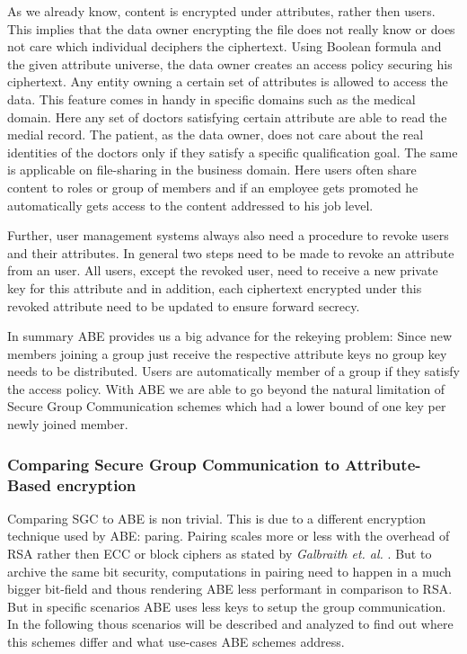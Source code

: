 As we already know, content is encrypted under attributes, rather then users. This implies that the data owner encrypting the file does not really know or does not care which individual deciphers the ciphertext. Using Boolean formula and the given attribute universe, the data owner creates an access policy securing his ciphertext. Any entity owning a certain set of attributes is allowed to access the data. This feature comes in handy in specific domains such as the medical domain. Here any set of doctors satisfying certain attribute are able to read the medial record. The patient, as the data owner, does not care about the real identities of the doctors only if they satisfy a specific qualification goal. The same is applicable on file-sharing in the business domain. Here users often share content to roles or group of members and if an employee gets promoted he automatically gets access to the content addressed to his job level. 

Further, user management systems always also need a procedure to revoke users and their attributes. 
In general two steps need to be made to revoke an attribute from an user. All users, except the revoked user, need to receive a new private key for this attribute and in addition, each ciphertext encrypted under this revoked attribute need to be updated to ensure forward secrecy. 

In summary ABE provides us a big advance for the rekeying problem: Since new members joining a group just receive the respective attribute keys no group key needs to be distributed. Users are automatically member of a group if they satisfy the access policy. With \ac{ABE} we are able to go beyond the natural limitation of Secure Group Communication schemes which had a lower bound of one key per newly joined member.  

\subsubsection{Comparing Secure Group Communication to Attribute-Based encryption}
Comparing \ac{SGC} to \ac{ABE} is non trivial. This is due to a different encryption technique used by \ac{ABE}: paring. Pairing scales more or less with the overhead of \ac{RSA} rather then \ac{ECC} or block ciphers as stated by \textit{Galbraith et. al.} \cite{galbraith2008pairings}. But to archive the same bit security, computations in pairing need to happen in a much bigger bit-field and thous rendering \ac{ABE} less performant in comparison to \ac{RSA}. But in specific scenarios \ac{ABE} uses less keys to setup the group communication. In the following thous scenarios will be described and analyzed to find out where this schemes differ and what use-cases \ac{ABE} schemes address.

